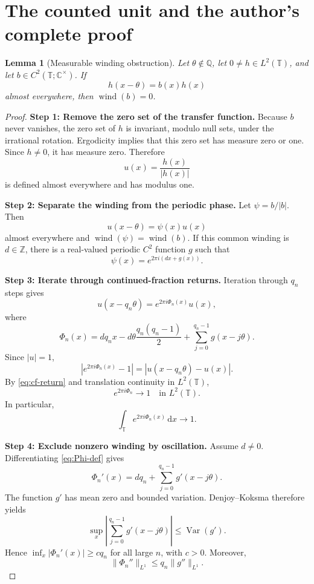 \documentclass[10pt,a4paper]{amsart}
\newcommand{\C}{\mathbb{C}}
\newcommand{\Q}{\mathbb{Q}}
\newcommand{\T}{\mathbb{T}}
\newcommand{\Var}{\operatorname{Var}}
\newcommand{\Z}{\mathbb{Z}}
\newcommand{\dd}{\,\mathrm{d}}
\newcommand{\wind}{\operatorname{wind}}
\theoremstyle{plain}
\newtheorem{lemma}[theorem]{Lemma}
\theoremstyle{remark}
\begin{document}
\section{The counted unit and the author's complete proof}

\begin{lemma}[Measurable winding obstruction]
\label{lem:winding}
Let \(\theta\notin\Q\), let \(0\neq h\in L^2(\T)\), and let
\(b\in C^2(\T;\C^\times)\). If
\begin{equation}
  h(x-\theta)=b(x)h(x)
  \label{eq:abstract-cocycle}
\end{equation}
almost everywhere, then \(\wind(b)=0\).
\end{lemma}

\begin{proof}
\textbf{Step 1: Remove the zero set of the transfer function.}
Because \(b\) never vanishes, the zero set of \(h\) is invariant, modulo null
sets, under the irrational rotation. Ergodicity implies that this zero set has
measure zero or one. Since \(h\neq0\), it has measure zero. Therefore
\[
  u(x)=\frac{h(x)}{|h(x)|}
\]
is defined almost everywhere and has modulus one.

\smallskip
\noindent
\textbf{Step 2: Separate the winding from the periodic phase.}
Let \(\psi=b/|b|\). Then
\[
  u(x-\theta)=\psi(x)u(x)
\]
almost everywhere and \(\wind(\psi)=\wind(b)\). If this common winding is
\(d\in\Z\), there is a real-valued periodic \(C^2\) function \(g\) such that
\[
  \psi(x)=e^{2\pi i(dx+g(x))}.
\]

\smallskip
\noindent
\textbf{Step 3: Iterate through continued-fraction returns.}
Iteration through \(q_n\) steps gives
\[
  u(x-q_n\theta)=e^{2\pi i\Phi_n(x)}u(x),
\]
where
\begin{equation}
  \Phi_n(x)
  =dq_nx-d\theta\frac{q_n(q_n-1)}2
   +\sum_{j=0}^{q_n-1}g(x-j\theta).
  \label{eq:Phi-def}
\end{equation}
Since \(|u|=1\),
\[
  |e^{2\pi i\Phi_n(x)}-1|
  =|u(x-q_n\theta)-u(x)|.
\]
By \eqref{eq:cf-return} and translation continuity in \(L^2(\T)\),
\begin{equation}
  e^{2\pi i\Phi_n}\longrightarrow1
  \quad\text{in }L^2(\T).
  \label{eq:phase-to-one}
\end{equation}
In particular,
\begin{equation}
  \int_\T e^{2\pi i\Phi_n(x)}\dd x\longrightarrow1.
  \label{eq:phase-integral-one}
\end{equation}

\smallskip
\noindent
\textbf{Step 4: Exclude nonzero winding by oscillation.}
Assume \(d\neq0\). Differentiating \eqref{eq:Phi-def} gives
\[
  \Phi_n'(x)
  =dq_n+\sum_{j=0}^{q_n-1}g'(x-j\theta).
\]
The function \(g'\) has mean zero and bounded variation. Denjoy--Koksma
therefore yields
\[
  \sup_x\left|
    \sum_{j=0}^{q_n-1}g'(x-j\theta)
  \right|
  \leq\Var(g').
\]
Hence \(\inf_x|\Phi_n'(x)|\geq c q_n\) for all large \(n\), with \(c>0\).
Moreover,
\[
  \|\Phi_n''\|_{L^1}
  \leq q_n\|g''\|_{L^1}.
\]


\end{proof}
\end{document}
